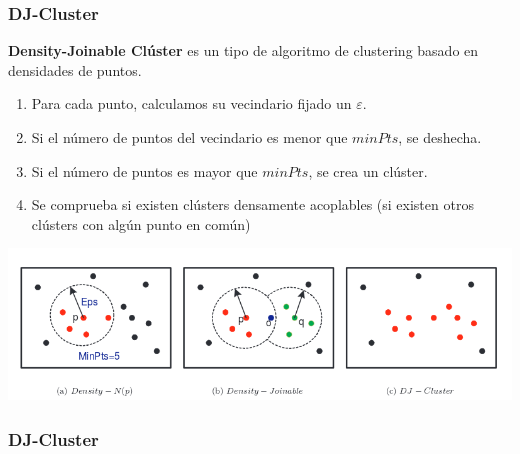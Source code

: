 \documentclass[10pt, spanish]{beamer}
\begin{document}
\begin{frame}[fragile]
\frametitle{DJ-Cluster}
\textbf{Density-Joinable Cl\'uster} es un tipo de algoritmo de clustering basado en densidades de puntos. \\

\begin{enumerate}
	\item Para cada punto, calculamos su vecindario fijado un $\varepsilon$.
	\item Si el n\'umero de puntos del vecindario es menor que $minPts$, se deshecha.
	\item Si el n\'umero de puntos es mayor que $minPts$, se crea un cl\'uster.
	\item Se comprueba si existen cl\'usters densamente acoplables (si existen otros cl\'usters con alg\'un punto en com\'un)
\end{enumerate}

\begin{center}
\includegraphics[scale=.45]{djcluster.png}
\end{center}
\end{frame}

\begin{frame}[fragile]
\frametitle{DJ-Cluster}
\begin{algorithmic}[1]
		\Else
		\EndIf
	\EndFor
\end{algorithmic}

\end{frame}
\end{document}
